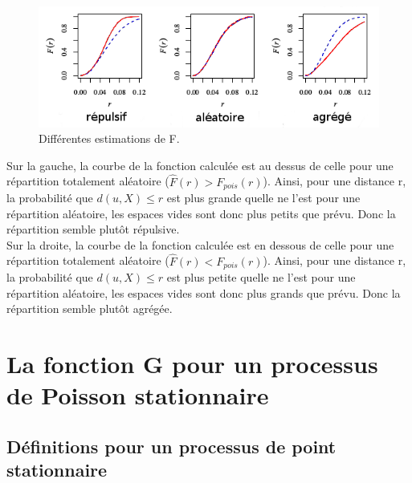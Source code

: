 \documentclass[stage2a]{tnreport}
\begin{document}
\begin{figure}[h]
  \centering
  \includegraphics[scale=0.7]{figures/interpretF2.png}
  \caption{Différentes estimations de F.}
  \label{fig:interpretF}
\end{figure}

Sur la gauche, la courbe de la fonction calculée est au dessus de celle pour une répartition totalement aléatoire (\begin{math}\hat{F}(r) > F_{pois}(r) \end{math}). Ainsi, pour une distance r, la probabilité que \begin{math} d(u,X) \leq r \end{math} est plus grande quelle ne l'est pour une répartition aléatoire, les espaces vides sont donc plus petits que prévu. Donc la répartition semble plutôt répulsive.\\
\indent
Sur la droite, la courbe de la fonction calculée est en dessous de celle pour une répartition totalement aléatoire (\begin{math}\hat{F}(r) < F_{pois}(r) \end{math}). Ainsi, pour une distance r, la probabilité que \begin{math} d(u,X) \leq r \end{math} est plus petite quelle ne l'est pour une répartition aléatoire, les espaces vides sont donc plus grands que prévu. Donc la répartition semble plutôt agrégée.



\section{La fonction G pour un processus de Poisson stationnaire}

\subsection{Définitions pour un processus de point stationnaire}
\end{document}
